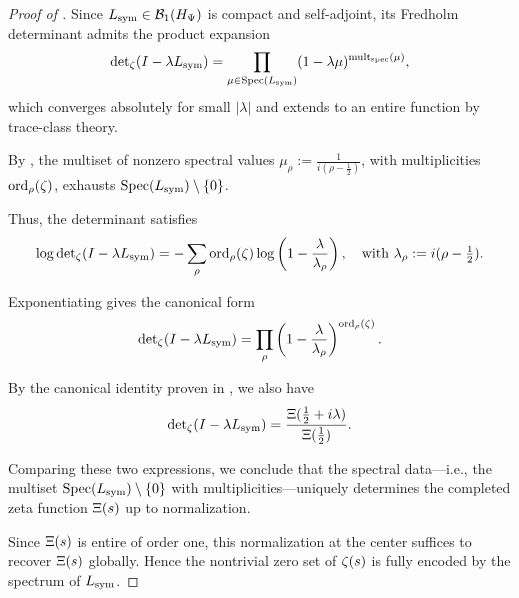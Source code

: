 \begin{proof}[Proof of ]
Since \( L_{\mathrm{sym}} \in \mathcal{B}_1(H_{\Psi}) \) is compact and self-adjoint, its Fredholm determinant admits the product expansion
\[
\det\nolimits_\zeta(I - \lambda L_{\mathrm{sym}}) = \prod_{\mu \in \operatorname{Spec}(L_{\mathrm{sym}})} (1 - \lambda \mu)^{\operatorname{mult}_{\mathrm{spec}}(\mu)},
\]
which converges absolutely for small \( |\lambda| \) and extends to an entire function by trace-class theory.

By , the multiset of nonzero spectral values \( \mu_\rho := \frac{1}{i(\rho - \tfrac{1}{2})} \), with multiplicities \( \operatorname{ord}_\rho(\zeta) \), exhausts \( \operatorname{Spec}(L_{\mathrm{sym}}) \setminus \{0\} \).

Thus, the determinant satisfies
\[
\log \det\nolimits_\zeta(I - \lambda L_{\mathrm{sym}}) = - \sum_{\rho} \operatorname{ord}_\rho(\zeta) \log\left(1 - \frac{\lambda}{\lambda_\rho} \right), \quad \text{with } \lambda_\rho := i(\rho - \tfrac{1}{2}).
\]

Exponentiating gives the canonical form
\[
\det\nolimits_\zeta(I - \lambda L_{\mathrm{sym}}) = \prod_{\rho} \left(1 - \frac{\lambda}{\lambda_\rho} \right)^{\operatorname{ord}_\rho(\zeta)}.
\]

By the canonical identity proven in , we also have
\[
\det\nolimits_\zeta(I - \lambda L_{\mathrm{sym}}) = \frac{\Xi(\tfrac{1}{2} + i\lambda)}{\Xi(\tfrac{1}{2})}.
\]

Comparing these two expressions, we conclude that the spectral data—i.e., the multiset \( \operatorname{Spec}(L_{\mathrm{sym}}) \setminus \{0\} \) with multiplicities—uniquely determines the completed zeta function \( \Xi(s) \) up to normalization.

Since \( \Xi(s) \) is entire of order one, this normalization at the center suffices to recover \( \Xi(s) \) globally. Hence the nontrivial zero set of \( \zeta(s) \) is fully encoded by the spectrum of \( L_{\mathrm{sym}} \).
\end{proof}
